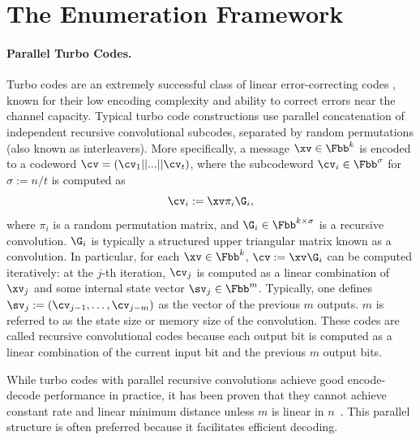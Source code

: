 
\section{The Enumeration Framework}\label{sec:turbo}

\paragraph{Parallel Turbo Codes.} Turbo codes are an extremely successful class of linear error-correcting codes \cite{turbo,vucetic2012turbo}, known for their low encoding complexity and ability to correct errors near the channel capacity. Typical turbo code constructions use parallel concatenation of independent recursive convolutional subcodes, separated by random permutations (also known as interleavers). More specifically, a message $\xv\in \Fbb^k$ is encoded to a codeword $\cv =(\cv_1 || ... || \cv_t)$, where the subcodeword $\cv_i\in \Fbb^{\sigma}$ for $\sigma:=n/t$ is computed as
$$
    \cv_i := \xv \pi_i \G_i,
$$
where $\pi_i$ is a random permutation matrix, and $\G_i\in \Fbb^{k\times \sigma}$ is a recursive convolution. $\G_i$ is typically a structured upper triangular matrix known as a convolution. In particular, for each $\xv\in \Fbb^k$, $\cv:=\xv\G_i$ can be computed iteratively: at the $j$-th iteration, $\cv_j$ is computed as a linear combination of $\xv_j$ and some internal state vector $\sv_j\in \Fbb^m$. Typically, one defines $\sv_j:=(\cv_{j-1},\ldots,\cv_{j-m})$ as the vector of the previous $m$ outputs. $m$ is referred to as the state size or memory size of the convolution. These codes are called recursive convolutional codes because each output bit is computed as a linear combination of the current input bit and the previous $m$ output bits.

While turbo codes with parallel recursive convolutions achieve good encode-decode performance in practice, it has been proven that they cannot achieve constant rate and linear minimum distance unless $m$ is linear in $n$~\cite{kahale1998minimum,spielman}. This parallel structure is often preferred because it facilitates efficient decoding.

